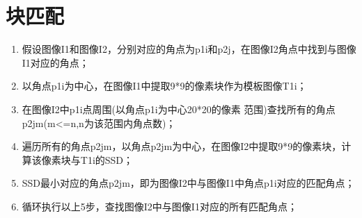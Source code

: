 \section{块匹配}
\begin{enumerate}  
\item 假设图像I1和图像I2，分别对应的角点为p1i和p2j，在图像I2角点中找到与图像I1对应的角点；
\item 以角点p1i为中心，在图像I1中提取9*9的像素块作为模板图像T1i；
\item 在图像I2中p1i点周围(以角点p1i为中心20*20的像素 范围)查找所有的角点p2jm(m<=n,n为该范围内角点数)；
\item 遍历所有的角点p2jm，以角点p2jm为中心，在图像I2中提取9*9的像素块，计算该像素块与T1i的SSD；
\item SSD最小对应的角点p2jm，即为图像I2中与图像I1中角点p1i对应的匹配角点；
\item 循环执行以上5步，查找图像I2中与图像I1对应的所有匹配角点；
\end{enumerate}